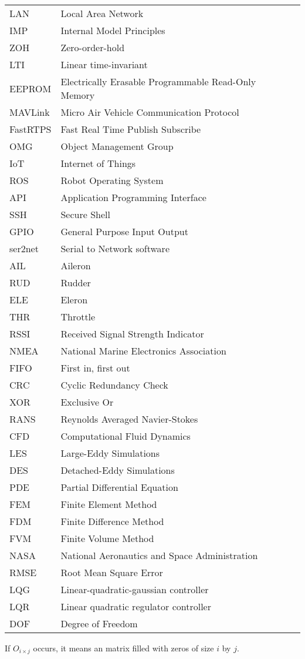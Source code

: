 \begin{table}[!h]
\begin{tabular}{l l r}
LAN			&Local Area Network\\
IMP			&Internal Model Principles\\
ZOH			&Zero-order-hold\\
LTI			&Linear time-invariant\\
EEPROM		&Electrically Erasable Programmable Read-Only Memory\\
MAVLink		&Micro Air Vehicle Communication Protocol\\
FastRTPS 	&Fast Real Time Publish Subscribe\\
OMG			&Object Management Group\\
IoT			&Internet of Things\\
ROS			&Robot Operating System\\
API			&Application Programming Interface\\
SSH			&Secure Shell\\
GPIO		&General Purpose Input Output\\
ser2net		&Serial to Network software\\
AIL			&Aileron\\
RUD			&Rudder\\
ELE			&Eleron\\
THR			&Throttle\\
RSSI		&Received Signal Strength Indicator\\
NMEA		&National Marine Electronics Association\\
FIFO		&First in, first out\\
CRC			&Cyclic Redundancy Check\\
XOR			&Exclusive Or\\
RANS 		&Reynolds Averaged Navier-Stokes\\
CFD			&Computational Fluid Dynamics\\
LES			&Large-Eddy Simulations\\
DES			&Detached-Eddy Simulations\\
PDE			&Partial Differential Equation\\
FEM			&Finite Element Method\\
FDM			&Finite Difference Method\\
FVM			&Finite Volume Method\\
NASA		&National Aeronautics and Space Administration\\
RMSE		&Root Mean Square Error\\
LQG			&Linear-quadratic-gaussian controller\\
LQR			&Linear quadratic regulator controller\\
DOF			&Degree of Freedom\\
\end{tabular}
\end{table}
\color{red}
If $O_{i \times j}$ occurs, it means an matrix filled with zeros of size $i$ by $j$.
\color{black}

